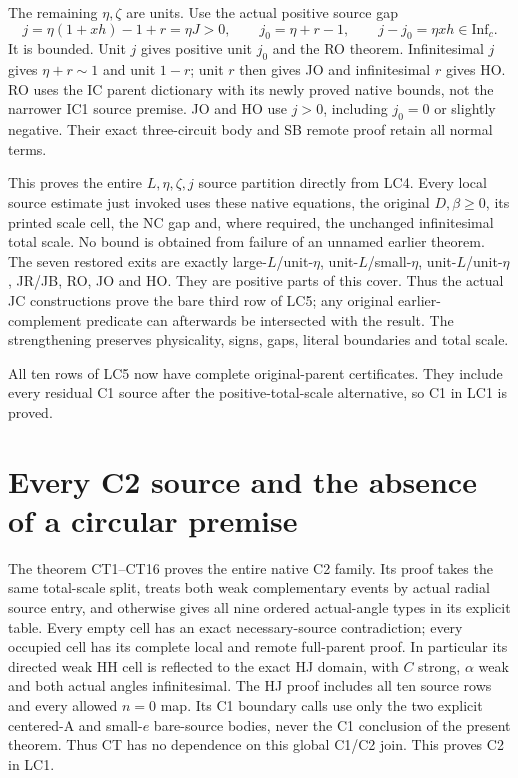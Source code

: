 The remaining \(\eta,\zeta\) are units.  Use the
actual positive source gap
\[
 j=\eta(1+xh)-1+r=\eta J>0,\qquad
 j_0=\eta+r-1,\qquad j-j_0=\eta xh\in\mathrm{Inf}_c .
\tag{LC4c}
\]
It is bounded.  Unit \(j\) gives positive unit \(j_0\)
and the RO theorem.  Infinitesimal \(j\) gives
\(\eta+r\sim1\) and unit \(1-r\); unit \(r\) then gives
JO and infinitesimal \(r\) gives HO.
RO uses the IC parent dictionary with its newly proved
native bounds, not the narrower IC1 source premise.
JO and HO use \(j>0\), including \(j_0=0\) or slightly
negative.  Their exact three-circuit body and SB remote
proof retain all normal terms.

This proves the entire \(L,\eta,\zeta,j\) source
partition directly from LC4.  Every local source
estimate just invoked uses these native equations,
the original \(D,\beta\geq0\), its printed scale cell,
the NC gap and, where required, the unchanged
infinitesimal total scale.  No bound is obtained from
failure of an unnamed earlier theorem.
The seven restored exits are exactly large-\(L\)/unit-\(\eta\),
unit-\(L\)/small-\(\eta\), unit-\(L\)/unit-\(\eta\),
JR/JB, RO, JO and HO.  They are positive parts of this
cover.  Thus the actual JC constructions prove the
bare third row of LC5; any original earlier-complement
predicate can afterwards be intersected with the result.
The strengthening preserves physicality, signs, gaps,
literal boundaries and total scale.

All ten rows of LC5 now have complete original-parent
certificates.  They include every residual C1 source after
the positive-total-scale alternative, so C1 in LC1 is proved.

\section{Every C2 source and the absence of a circular premise}

The theorem CT1--CT16 proves the entire native C2 family.
Its proof takes the same total-scale split, treats both
weak complementary events by actual radial source entry,
and otherwise gives all nine ordered actual-angle types
in its explicit table.  Every empty cell has an exact
necessary-source contradiction; every occupied cell has
its complete local and remote full-parent proof.
In particular its directed weak HH cell is reflected to
the exact HJ domain, with \(C\) strong, \(\alpha\) weak
and both actual angles infinitesimal.
The HJ proof includes all ten source rows and every
allowed \(n=0\) map.  Its C1 boundary calls use only the
two explicit centered-A and small-\(e\) bare-source bodies,
never the C1 conclusion of the present theorem.
Thus CT has no dependence on this global C1/C2 join.
This proves C2 in LC1.

